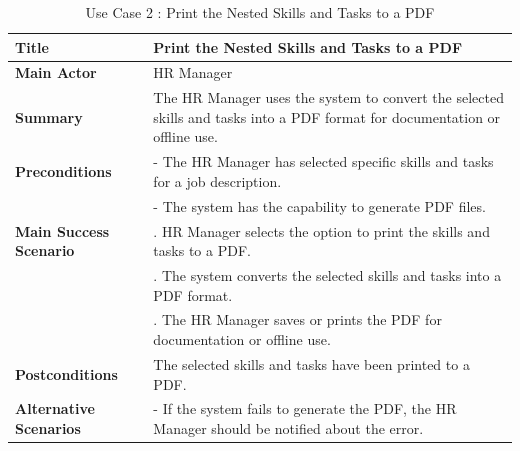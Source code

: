\begin{table}[H]
    \renewcommand{\arraystretch}{1.5}%
    \caption{Use Case 2 : Print the Nested Skills and Tasks to a PDF}
    \centering
    \medskip
    \small
    \begin{tabularx}{1.2\textwidth} {
            | >{\hsize=0.4\hsize\raggedright\arraybackslash}X
            | >{\hsize=1.6\hsize\raggedright\arraybackslash}X |}
        \hline
        \textbf{Title}                 & Print the Nested Skills and Tasks to a PDF                                                                                  \\
        \hline
        \textbf{Main Actor}            & HR Manager                                                                                                                  \\
        \hline
        \textbf{Summary}               & The HR Manager uses the system to convert the selected skills and tasks into a PDF format for documentation or offline use. \\
        \hline
        \textbf{Preconditions}         & - The HR Manager has selected specific skills and tasks for a job description.                                              \\
                                       & - The system has the capability to generate PDF files.                                                                      \\
        \hline
        \textbf{Main Success Scenario} & 1. HR Manager selects the option to print the skills and tasks to a PDF.                                                    \\
                                       & 2. The system converts the selected skills and tasks into a PDF format.                                                     \\
                                       & 3. The HR Manager saves or prints the PDF for documentation or offline use.                                                 \\
        \hline
        \textbf{Postconditions}        & The selected skills and tasks have been printed to a PDF.                                                                   \\
        \hline
        \textbf{Alternative Scenarios} & - If the system fails to generate the PDF, the HR Manager should be notified about the error.                               \\
        \hline
    \end{tabularx}
    \normalsize
\end{table}


